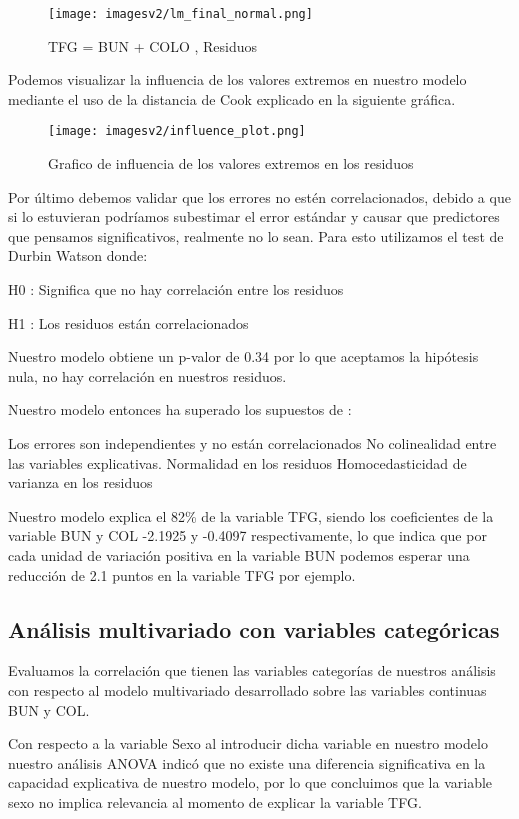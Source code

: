 \documentclass[runningheads,a4paper]{llncs}
\begin{document}
\begin{figure}[!ht]
\centering
\texttt{[image: imagesv2/lm\_final\_normal.png]}
\caption{TFG = BUN + COLO , Residuos }
\label{fig:lm_both_residuals}
\end{figure}

Podemos visualizar la influencia de los valores extremos en nuestro modelo mediante el uso de la distancia de Cook explicado en la siguiente gráfica.

\begin{figure}[!ht]
\centering
\texttt{[image: imagesv2/influence\_plot.png]}
\caption{Grafico de influencia de los valores extremos en los residuos}
\label{fig:influence_plot}
\end{figure}


Por último debemos validar que los errores no estén correlacionados, debido a que si lo estuvieran podríamos subestimar el error estándar y causar que predictores que pensamos significativos, realmente no lo sean. Para esto utilizamos el test de Durbin Watson donde:

H0 : Significa que no hay correlación entre los residuos 

H1 : Los residuos están correlacionados

Nuestro modelo obtiene un p-valor de 0.34 por lo que aceptamos la hipótesis nula, no hay correlación en nuestros residuos.

Nuestro modelo entonces ha superado los supuestos de :

Los errores son independientes y no están correlacionados
No colinealidad entre las variables explicativas.
Normalidad en los residuos 
Homocedasticidad de varianza en los residuos 
 
Nuestro modelo explica el 82\% de la variable TFG, siendo los coeficientes de la variable BUN y COL -2.1925 y -0.4097 respectivamente, lo que indica que por cada unidad de variación positiva en la variable BUN podemos esperar una reducción de 2.1 puntos en la variable TFG por ejemplo.

\subsection{Análisis multivariado con variables categóricas}

Evaluamos la correlación que tienen las variables categorías de nuestros análisis con respecto al modelo multivariado desarrollado sobre las variables continuas BUN y COL.

Con respecto a la variable Sexo al introducir dicha variable en nuestro modelo nuestro análisis ANOVA indicó que no existe una diferencia significativa en la capacidad explicativa de nuestro modelo, por lo que concluimos que la variable sexo no implica relevancia al momento de explicar la variable TFG.
\end{document}
